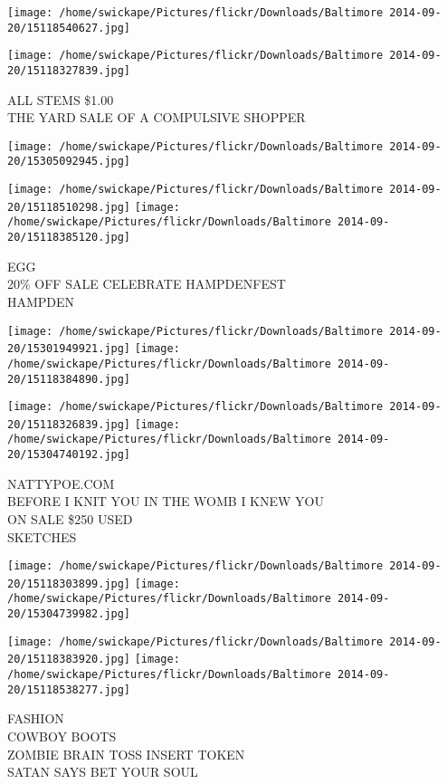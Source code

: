 \documentclass[10pt,letterpaper]{article}
\begin{document}
\texttt{[image: /home/swickape/Pictures/flickr/Downloads/Baltimore 2014-09-20/15118540627.jpg]}

\vspace{0.25in}
\texttt{[image: /home/swickape/Pictures/flickr/Downloads/Baltimore 2014-09-20/15118327839.jpg]}

ALL STEMS \$1.00\\
THE YARD SALE OF A COMPULSIVE SHOPPER
\pagebreak

\texttt{[image: /home/swickape/Pictures/flickr/Downloads/Baltimore 2014-09-20/15305092945.jpg]}

\vspace{0.25in}
\texttt{[image: /home/swickape/Pictures/flickr/Downloads/Baltimore 2014-09-20/15118510298.jpg]}
\texttt{[image: /home/swickape/Pictures/flickr/Downloads/Baltimore 2014-09-20/15118385120.jpg]}

EGG\\
20\% OFF SALE CELEBRATE HAMPDENFEST\\
HAMPDEN
\pagebreak

\texttt{[image: /home/swickape/Pictures/flickr/Downloads/Baltimore 2014-09-20/15301949921.jpg]}
\texttt{[image: /home/swickape/Pictures/flickr/Downloads/Baltimore 2014-09-20/15118384890.jpg]}

\texttt{[image: /home/swickape/Pictures/flickr/Downloads/Baltimore 2014-09-20/15118326839.jpg]}
\texttt{[image: /home/swickape/Pictures/flickr/Downloads/Baltimore 2014-09-20/15304740192.jpg]}

NATTYPOE.COM\\
BEFORE I KNIT YOU IN THE WOMB I KNEW YOU\\
ON SALE \$250 USED\\
SKETCHES
\pagebreak

\texttt{[image: /home/swickape/Pictures/flickr/Downloads/Baltimore 2014-09-20/15118303899.jpg]}
\texttt{[image: /home/swickape/Pictures/flickr/Downloads/Baltimore 2014-09-20/15304739982.jpg]}

\texttt{[image: /home/swickape/Pictures/flickr/Downloads/Baltimore 2014-09-20/15118383920.jpg]}
\texttt{[image: /home/swickape/Pictures/flickr/Downloads/Baltimore 2014-09-20/15118538277.jpg]}

FASHION\\
COWBOY BOOTS\\
ZOMBIE BRAIN TOSS INSERT TOKEN\\
SATAN SAYS BET YOUR SOUL
\pagebreak
\end{document}
